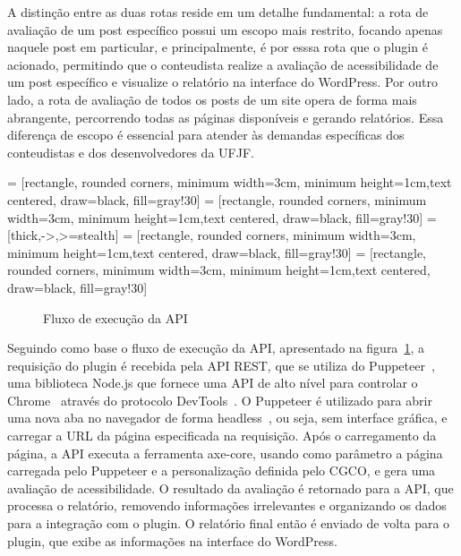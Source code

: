 \documentclass[
    12pt,
    a4paper,
    oneside,
    brazil,
    english
]{article}
\begin{document}
A distinção entre as duas rotas reside em um detalhe fundamental: a rota
de avaliação de um post específico possui um escopo mais restrito, focando
apenas naquele post em particular, e principalmente, é por esssa rota que
o plugin é acionado, permitindo que o conteudista realize a avaliação de
acessibilidade de um post específico e visualize o relatório na interface do
WordPress. Por outro lado, a rota de avaliação de todos os posts de um site
opera de forma mais abrangente, percorrendo todas as páginas disponíveis
e gerando relatórios. Essa diferença de escopo é essencial para atender às
demandas específicas dos conteudistas e dos desenvolvedores da UFJF.
\bigbreak

 = [rectangle, rounded corners, minimum width=3cm,
minimum height=1cm,text centered, draw=black, fill=gray!30]
 = [rectangle, rounded corners, minimum width=3cm,
minimum height=1cm,text centered, draw=black, fill=gray!30]
 = [thick,->,>=stealth]
 = [rectangle, rounded corners, minimum width=3cm,
minimum height=1cm,text centered, draw=black, fill=gray!30]
 = [rectangle, rounded corners, minimum width=3cm,
minimum height=1cm,text centered, draw=black, fill=gray!30]
\begin{figure}[ht]
  \centering
  \caption{Fluxo de execução da API}
  \label{fig:fluxo}
\end{figure}

Seguindo como base o fluxo de execução da API, apresentado na figura~\ref{fig:fluxo},
a requisição do plugin é recebida pela API REST, que se utiliza
do Puppeteer~\cite{puppeteer}, uma biblioteca Node.js que fornece uma
API de alto nível para controlar o Chrome~\cite{chrome} através do protocolo
DevTools~\cite{devtools}. O Puppeteer é utilizado para abrir uma nova aba no navegador de forma
headless~\cite{headless}, ou seja, sem interface gráfica, e carregar a URL da página
especificada na requisição. Após o carregamento da página, a API
executa a ferramenta axe-core, usando como parâmetro a página carregada
pelo Puppeteer e a personalização definida pelo CGCO, e gera uma avaliação
de acessibilidade. O resultado da avaliação é retornado para a API, que
processa o relatório, removendo informações irrelevantes e organizando os dados
para a integração com o plugin. O relatório final então é enviado de
volta para o plugin, que exibe as informações na interface do WordPress.
\end{document}
